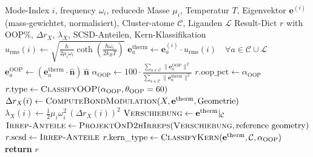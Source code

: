 \documentclass[11pt,a4paper,twoside]{article}
\theoremstyle{remark}
\begin{document}
\begin{algorithm}[H]
\caption{\textsc{AnalyzeMode}}
\begin{algorithmic}[1]
\Require Mode-Index $i$, frequency $\omega_i$, reducede Masse $\mu_i$,
         Temperatur $T$, Eigenvektor $\mathbf{e}^{(i)}$ (mass-gewichtet,
         normalisiert), Cluster-atome $\mathcal{C}$,
         Liganden $\mathcal{L}$
\Ensure Result-Dict $r$ with OOP\%, $\Delta r_X$, $\lambda_X$,
        SCSD-Anteilen, Kern-Klassifikation
\State {}
\State $u_\text{rms}(i) \gets \sqrt{\frac{\hbar}{2\mu_i\omega_i}
       \coth\!\left(\frac{\hbar\omega_i}{2 k_B T}\right)}$
\State $\mathbf{e}^\text{therm}_a \gets \mathbf{e}_a^{(i)} \cdot u_\text{rms}(i)
       \quad \forall a \in \mathcal{C} \cup \mathcal{L}$
\State {}
\State $\mathbf{e}_a^\text{OOP} \gets (\mathbf{e}^\text{therm}_a \cdot
       \hat{\mathbf{n}})\,\hat{\mathbf{n}}$
\State $\alpha_\text{OOP} \gets 100 \cdot
       \frac{\sum_{a\in\mathcal{C}} \|\mathbf{e}_a^\text{OOP}\|^2}
            {\sum_{a\in\mathcal{C}} \|\mathbf{e}^\text{therm}_a\|^2}$
\State $r.\text{oop\_pct} \gets \alpha_\text{OOP}$
\State $r.\text{type} \gets \textsc{ClassifyOOP}(\alpha_\text{OOP},
       \theta_\text{OOP}=60)$
\State {}
  \State $\Delta r_X(i) \gets \textsc{ComputeBondModulation}(X,
         \mathbf{e}^\text{therm}, \text{Geometrie})$
  \State $\lambda_X(i) \gets \tfrac{1}{2}\mu_i \omega_i^2 \,(\Delta r_X(i))^2$
\EndFor
\State {}
  \State $\textsc{Verschiebung} \gets \mathbf{e}^\text{therm}|_\mathcal{C}$
  \State $\textsc{Irrep-Anteile} \gets \textsc{ProjektOnD2hIrreps}(
         \textsc{Verschiebung}, \text{reference geometry})$
  \State $r.\text{scsd} \gets \textsc{Irrep-Anteile}$
\EndIf
\State {}
\State $r.\text{kern\_type} \gets \textsc{ClassifyKern}(\mathbf{e}^\text{therm},
       \mathcal{C}, \alpha_\text{OOP})$
\State \textbf{return} $r$
\end{algorithmic}
\end{algorithm}
\end{document}
